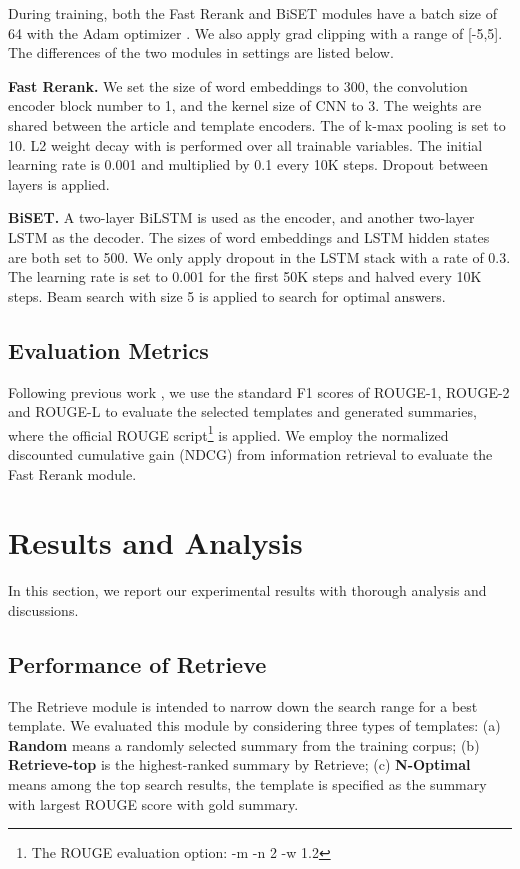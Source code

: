 \documentclass[11pt,a4paper]{article}
\begin{document}
\begin{spacing}{1.0}
During training, both the Fast Rerank and BiSET modules have a batch size of 64 with the Adam optimizer \cite{Kingma2014Adam}. We also apply grad clipping \cite{pascanu2013difficulty} with a range of [-5,5]. The differences of the two modules in settings are listed below.

\noindent\textbf{Fast Rerank.} We set the size of word embeddings to 300, the convolution encoder block number to 1, and the kernel size of CNN to 3. The weights are shared between the article and template encoders. The  of k-max pooling is set to 10. L2 weight decay with  is performed over all trainable variables. The initial learning rate is 0.001 and multiplied by 0.1 every 10K steps. Dropout between layers is applied.

\noindent\textbf{BiSET.} A two-layer BiLSTM is used as the encoder, and another two-layer LSTM as the decoder. The sizes of word embeddings and LSTM hidden states are both set to 500. We only apply dropout in the LSTM stack with a rate of 0.3. The learning rate is set to 0.001 for the first 50K steps and halved every 10K steps. Beam search with size 5 is applied to search for optimal answers.

\subsection{Evaluation Metrics}
Following previous work \cite{Nallapati2016Abstractive,Zhou2017Selective,cao2018retrieve}, we use the standard F1 scores of ROUGE-1, ROUGE-2 and ROUGE-L \cite{Lin2003Automatic} to evaluate the selected templates and generated summaries, where the official ROUGE script\footnote{The ROUGE evaluation option: -m -n 2 -w 1.2} is applied. We employ the normalized discounted cumulative gain (NDCG) \cite{jarvelin2002cumulated} from information retrieval to evaluate the Fast Rerank module.

\section{Results and Analysis}
In this section, we report our experimental results with thorough analysis and discussions.

\subsection{Performance of Retrieve}\label{sec:retrieve}
The Retrieve module is intended to narrow down the search range for a best template. We evaluated this module by considering three types of templates: (a) \noindent\textbf{Random} means a randomly selected summary from the training corpus; (b) \noindent\textbf{Retrieve-top} is the highest-ranked summary by Retrieve; (c) \noindent\textbf{N-Optimal} means among the  top search results, the template is specified as the summary with largest ROUGE score with gold summary.


\end{spacing}
\end{document}

